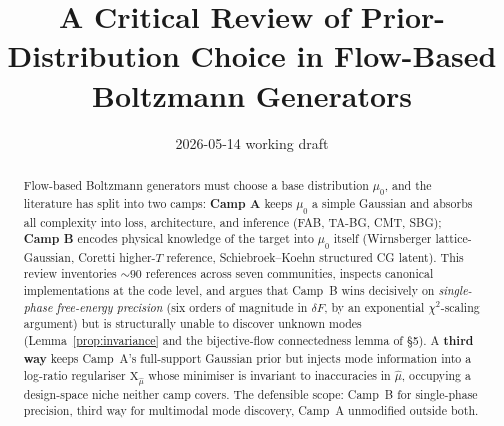 \documentclass[11pt,letterpaper]{article}
\title{A Critical Review of Prior-Distribution Choice in Flow-Based\\Boltzmann Generators}
\author{}
\date{2026-05-14 working draft}
\newcommand{\Xfun}{\mathrm{X}}
\theoremstyle{plain}
\begin{document}
\maketitle

\begin{abstract}\noindent
Flow-based Boltzmann generators must choose a base distribution $\mu_0$, and
the literature has split into two camps: \textbf{Camp A} keeps $\mu_0$ a simple
Gaussian and absorbs all complexity into loss, architecture, and inference
(FAB, TA-BG, CMT, SBG); \textbf{Camp B} encodes physical knowledge of the target
into $\mu_0$ itself (Wirnsberger lattice-Gaussian, Coretti higher-$T$ reference,
Schiebroek--Koehn structured CG latent). This review inventories
${\sim}90$ references across seven communities, inspects canonical implementations
at the code level, and argues that Camp~B wins decisively on \emph{single-phase
free-energy precision} (six orders of magnitude in $\delta F$, by an exponential
$\chi^2$-scaling argument) but is structurally unable to discover unknown modes
(Lemma~\ref{prop:invariance} and the bijective-flow connectedness lemma of \S5).
A \textbf{third way} keeps Camp~A's full-support Gaussian prior but injects mode
information into a log-ratio regulariser $\Xfun_{\hat\mu}$ whose minimiser is
invariant to inaccuracies in $\hat\mu$, occupying a design-space niche neither
camp covers. The defensible scope: Camp~B for single-phase precision, third
way for multimodal mode discovery, Camp~A unmodified outside both.
\end{abstract}

\bigskip
\end{document}
